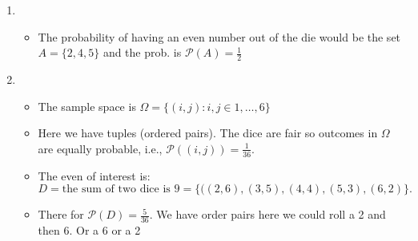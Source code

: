 \documentclass[a4paper]{article}
\numberwithin{counter}{subsection}
\theoremstyle{break}
\begin{document}
\begin{sol}
    \begin{enumerate}
        \item \begin{itemize}
            \item The probability of having an even number out of the die would be the set $A = \{2,4,5\} $ and the prob. is $\mathcal{P}(A) = \frac{1}{2}$  
        \end{itemize}
    \item \begin{itemize}
        \item The sample space is $\Omega = \{(i,j) : i, j \in {1, \ldots, 6}\} $
        \item Here we have tuples (ordered pairs). The dice are fair so outcomes in $\Omega$ are equally probable, i.e., $\mathcal{P}({(i,j)}) = \frac{1}{36}$.
        \item The even of interest is: \[
                D = {\text{the sum of two dice is 9}} = \{((2,6), (3,5), (4,4), (5,3), (6,2)\} 
            .\] 
        \item There for $\mathcal{P}(D) = \frac{5}{36}.$ We have order pairs here we could roll a 2 and then 6. Or a 6 or a 2
    \end{itemize}
    \end{enumerate}
\end{sol}
\end{document}
